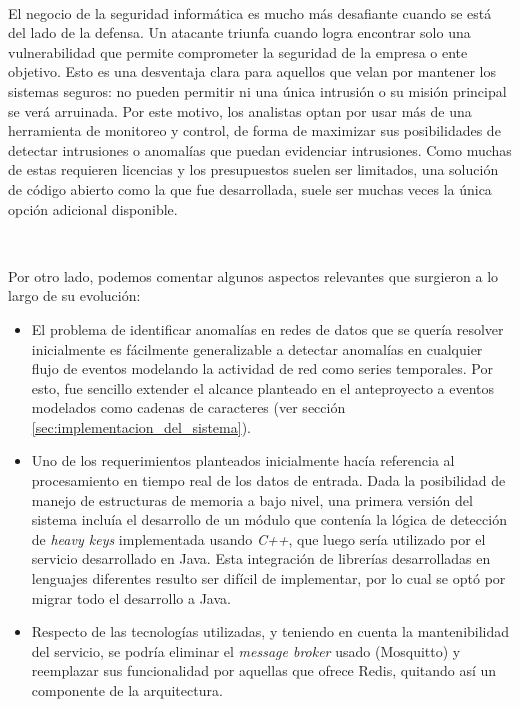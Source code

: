 \documentclass[a4paper,12pt, oneside]{article}
\begin{document}
\

El negocio de la seguridad informática es mucho más desafiante cuando se está del lado de la defensa. Un atacante triunfa cuando logra encontrar solo una vulnerabilidad que permite comprometer la seguridad de la empresa o ente objetivo. Esto es una desventaja clara para aquellos que velan por mantener los sistemas seguros: no pueden permitir ni una única intrusión o su misión principal se verá arruinada. Por este motivo, los analistas optan por usar más de una herramienta de monitoreo y control, de forma de maximizar sus posibilidades de detectar intrusiones o anomalías que puedan evidenciar intrusiones. Como muchas de estas requieren licencias y los presupuestos suelen ser limitados, una solución de código abierto como la que fue desarrollada, suele ser muchas veces la única opción adicional disponible.

\

Por otro lado, podemos comentar algunos aspectos relevantes que surgieron a lo largo de su evolución:

\begin{itemize}
	\item El problema de identificar anomalías en redes de datos que se quería resolver inicialmente es fácilmente generalizable a detectar anomalías en cualquier flujo de eventos modelando la actividad de red como series temporales. Por esto, fue sencillo extender el alcance planteado en el anteproyecto a eventos modelados como cadenas de caracteres (ver sección \ref{sec:implementacion_del_sistema}).
	\item Uno de los requerimientos planteados inicialmente hacía referencia al procesamiento en tiempo real de los datos de entrada. Dada la posibilidad de manejo de estructuras de memoria a bajo nivel, una primera versión del sistema incluía el desarrollo de un módulo que contenía la lógica de detección de \textit{heavy keys} implementada usando \textit{C++}, que luego sería utilizado por el servicio desarrollado en Java. Esta integración de librerías desarrolladas en lenguajes diferentes resulto ser difícil de implementar, por lo cual se optó por migrar todo el desarrollo a Java.
	\item Respecto de las tecnologías utilizadas, y teniendo en cuenta la mantenibilidad del servicio, se podría eliminar el \textit{message broker} usado (Mosquitto) y reemplazar sus funcionalidad por aquellas que ofrece Redis, quitando así un componente de la arquitectura. 
\end{itemize}
\end{document}

